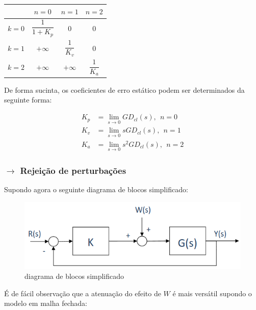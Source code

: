 \begin{table}[h!]
\centering
\renewcommand{\arraystretch}{2.7} %
\begin{tabular}{|c|c|c|c|}
\hline
 & $n = 0$ & $n = 1$ & $n = 2$ \\
\hline
$k = 0$ & $\dfrac{1}{1 + K_p}$ & $0$ & $0$ \\
\hline
$k = 1$ & $+\infty$ & $\dfrac{1}{K_v}$ & $0$ \\
\hline
$k = 2$ & $+\infty$ & $+\infty$ & $\dfrac{1}{K_a}$ \\
\hline
\end{tabular}
\label{tab:system_types}
\end{table}

\noindent De forma sucinta, os coeficientes de erro estático podem ser determinados da seguinte forma:

$$
    \begin{aligned}
        K_p &= \lim_{s \to 0}G D_{cl}(s),\;\, n = 0\\[4pt]
        K_v &= \lim_{s \to 0}s G D_{cl}(s),\;\, n = 1\\[4pt]
        K_a &= \lim_{s \to 0}s^2 G D_{cl}(s),\;\, n = 2
    \end{aligned}
$$

\newpage
\subsubsection[3.2.2 Rejeição de perturbações]{$\pmb{\rightarrow}$ Rejeição de perturbações}
\noindent Supondo agora o seguinte diagrama de blocos simplificado:

\begin{figure}[H]
    \centering
    \includegraphics[width = 0.9\linewidth]{img/3/feedback-loop-simp.png}
    \caption{diagrama de blocos simplificado}
    \label{fig:feed-loop-simp}
\end{figure}

\noindent É de fácil observação que a atenuação do efeito de $W$ é mais versátil supondo o modelo em malha fechada:

